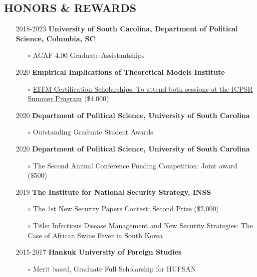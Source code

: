 \documentclass[11pt]{res} %
\begin{document}
\begin{resume}
\section{HONORS \& REWARDS} 
\begin{itemize}[wide = 0pt] \itemsep -2pt 
	\item[2018-2023] \textbf{University of South Carolina, Department of Political Science, Columbia, SC}
	\begin{itemize} \itemsep -2pt 
		\item[$\circ$] ACAF 4.00 Graduate Assistantships
	\end{itemize} \itemsep -2pt 
	\item[2020] \textbf{Empirical Implications of Theoretical Models Institute}
	\begin{itemize} \itemsep -2pt 
		\item[$\circ$] \href{https://52.2.147.143/icpsrweb/content/sumprog/scholarships/winners-2020.html}{EITM Certification Scholarships: To attend both sessions at the ICPSR Summer Program} (\$4,000)
	\end{itemize} 
	\item[2020] \textbf{Department of Political Science, University of South Carolina}
	\begin{itemize} \itemsep -2pt 
		\item[$\circ$] Outstanding Graduate Student Awards
	\end{itemize} 
	\item[2020] \textbf{Department of Political Science, University of South Carolina}
	\begin{itemize} \itemsep -2pt 
		\item[$\circ$] The Second Annual Conference Funding Competition: Joint award (\$500)
	\end{itemize} 
	\item[2019] \textbf{The Institute for National Security Strategy, INSS}
	\begin{itemize} \itemsep -2pt 
		\item[$\circ$] The 1st New Security Papers Contest: Second Prize (\$2,000)
		\item[$\circ$] Title: Infectious Disease Management and New Security Strategies: The Case of African Swine Fever in South Korea
	\end{itemize}
	\item[2015-2017] \textbf{Hankuk University of Foreign Studies}
	\begin{itemize} \itemsep -2pt 
		\item[$\circ$] Merit based, Graduate Full Scholarship for HUFSAN
	\end{itemize}
\end{itemize}


\end{resume}
\end{document}

